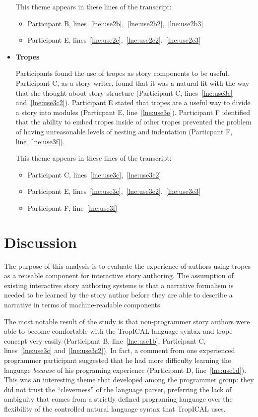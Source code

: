 \documentclass[11pt]{report}
\newcommand{\lref}[1]{\hyperlink{llineno:#1}{\ref*{#1}}}
\begin{document}
\begin{itemize}
This theme appears in these lines of the transcript:

\begin{itemize}
\item Participant B, lines~\lref{lne:use2b},~\lref{lne:use2b2},~\lref{lne:use2b3}
\item Participant E, lines~\lref{lne:use2e},~\lref{lne:use2e2},~\lref{lne:use2e3}
\end{itemize}

\item \textbf{Tropes}

Participants found the use of tropes as story components to be useful.
Participant C, as a story writer, found that it was a natural fit with the way
that she thought about story structure (Participant C, lines~\lref{lne:use3c}
and~\lref{lne:use3c2}). Participant E stated that tropes are a useful way to
divide a story into modules (Particpant E, line~\lref{lne:use3e}).
Participant F identified that the ability to embed tropes inside of other tropes
prevented the problem of having unreasonable levels of nesting and indentation
(Particpant F, line~\lref{lne:use3f}).

This theme appears in these lines of the transcript:
  
\begin{itemize}
\item Participant C, lines~\lref{lne:use3c},~\lref{lne:use3c2}
\item Participant E, lines~\lref{lne:use3e},~\lref{lne:use3e2},~\lref{lne:use3e3}
\item Participant F, line~\lref{lne:use3f}
\end{itemize}
\end{itemize}

\section{Discussion}

The purpose of this analysis is to evaluate the experience of authors using
tropes as a reusable component for interactive story authoring. The assumption
of existing interactive story authoring systems is that a narrative formalism is
needed to be learned by the story author before they are able to describe a
narrative in terms of machine-readable components.

The most notable result of the study is that non-programmer story authors were able
to become comfortable with the TropICAL language syntax and trope concept very
easily (Participant B, line~\lref{lne:use1b}, Participant C,
lines~\lref{lne:use3c} and~\lref{lne:use3c2}). In fact, a comment from one experienced programmer participant
suggested that he had more difficulty learning the language
\emph{because} of his programing experience (Participant D,
line~\lref{lne:use1d}). This was an interesting theme that developed among
the programmer group: they did not trust the ``cleverness'' of the language
parser, preferring the lack of ambiguity that comes from a strictly defined
programing language over the flexibility of the controlled natural language
syntax that TropICAL uses.
\end{document}
